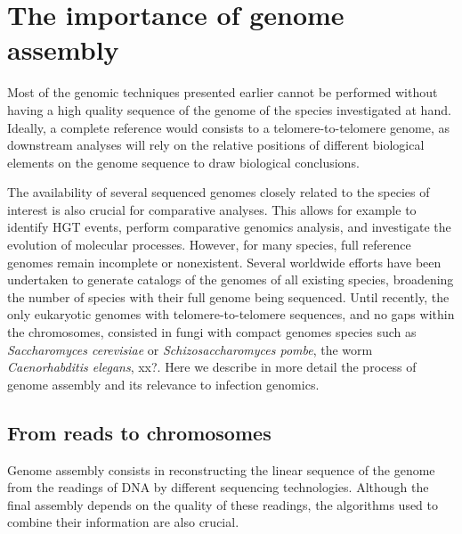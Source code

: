 

\chapter{The importance of genome assembly} %

\label{ch:01-03} %

Most of the genomic techniques presented earlier cannot be performed without having a high quality sequence of the genome of the species investigated at hand. Ideally, a complete reference would consists to a telomere-to-telomere genome, as downstream analyses will rely on the relative positions of different biological elements on the genome sequence to draw biological conclusions. 

The availability of several sequenced genomes closely related to the species of interest is also crucial for comparative analyses. This allows for example to identify \acrshort{HGT} events, perform comparative genomics analysis, and investigate the evolution of molecular processes. However, for many species, full reference genomes remain incomplete or nonexistent. Several worldwide efforts have been undertaken to generate catalogs of the genomes of all existing species, broadening the number of species with their full genome being sequenced. Until recently, the only eukaryotic genomes with telomere-to-telomere sequences, and no gaps within the chromosomes, consisted in fungi with compact genomes species such as \textit{Saccharomyces cerevisiae} or \textit{Schizosaccharomyces pombe}, the worm \textit{Caenorhabditis elegans}, xx?. Here we describe in more detail the process of genome assembly and its relevance to infection genomics.

\section{From reads to chromosomes}

Genome assembly consists in reconstructing the linear sequence of the genome from the readings of DNA by different sequencing technologies. Although the final assembly depends on the quality of these readings, the algorithms used to combine their information are also crucial.

